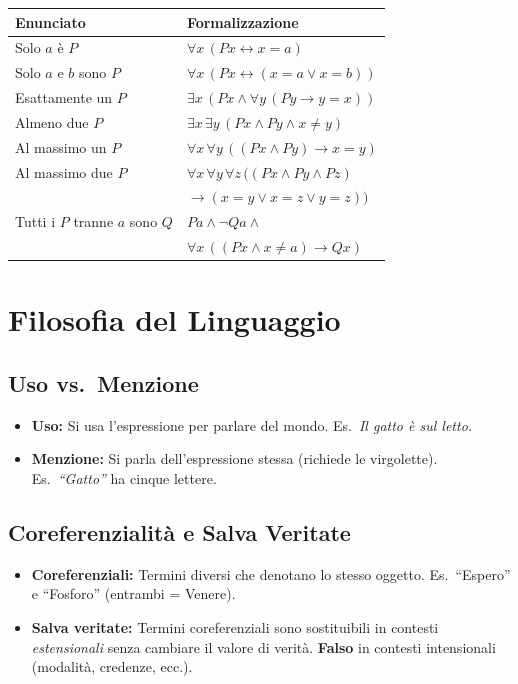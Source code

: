 \documentclass[10pt,a4paper]{article}
\newcommand{\liff}{\leftrightarrow}
\begin{document}
\begin{tabular}{@{}p{4cm}p{3.8cm}@{}}
  \toprule
  \textbf{Enunciato} & \textbf{Formalizzazione} \\
  \midrule
  Solo $a$ è $P$ &
    $\forall x\,(Px \liff x{=}a)$ \\
  Solo $a$ e $b$ sono $P$ &
    $\forall x\,(Px \liff (x{=}a \lor x{=}b))$ \\
  Esattamente un $P$ &
    $\exists x\,(Px \land \forall y\,(Py \to y{=}x))$ \\
  Almeno due $P$ &
    $\exists x\,\exists y\,(Px \land Py \land x{\neq}y)$ \\
  Al massimo un $P$ &
    $\forall x\,\forall y\,((Px \land Py) \to x{=}y)$ \\
  Al massimo due $P$ &
    $\forall x\,\forall y\,\forall z\,((Px \land Py \land Pz)$ \\
    & $\to (x{=}y \lor x{=}z \lor y{=}z))$ \\
  Tutti i $P$ tranne $a$ sono $Q$ &
    $Pa \land \lnot Qa \land {}$ \\
    & $\forall x\,((Px \land x{\neq}a) \to Qx)$ \\
  \bottomrule
\end{tabular}

\newpage
\section{Filosofia del Linguaggio}

\subsection{Uso vs.\ Menzione}
\begin{itemize}[leftmargin=*, itemsep=1pt, topsep=0pt]
  \item \textbf{Uso:} Si usa l'espressione per parlare del mondo.
    Es.\ \textit{Il gatto è sul letto.}
  \item \textbf{Menzione:} Si parla dell'espressione stessa
    (richiede le virgolette).
    Es.\ \textit{``Gatto''} ha cinque lettere.
\end{itemize}

\subsection{Coreferenzialità e Salva Veritate}
\begin{itemize}[leftmargin=*, itemsep=1pt, topsep=0pt]
  \item \textbf{Coreferenziali:} Termini diversi che denotano lo stesso
    oggetto. Es.\ ``Espero'' e ``Fosforo'' (entrambi = Venere).
  \item \textbf{Salva veritate:} Termini coreferenziali sono
    sostituibili in contesti \emph{estensionali} senza cambiare il
    valore di verità. \textbf{Falso} in contesti intensionali
    (modalità, credenze, ecc.).
\end{itemize}
\end{document}
